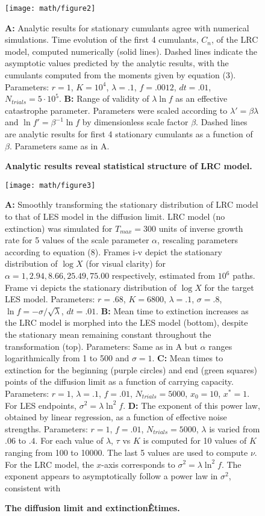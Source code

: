 \newpage
\begin{figure}
\centerline{
	\texttt{[image: math/figure2]}}
	\caption{\textbf{Analytic results reveal statistical structure of LRC model.}}  {\textbf{A:  }Analytic results for stationary cumulants agree with numerical simulations.  Time evolution of the first 4 cumulants, $C_n$, of the LRC model, computed numerically (solid lines).  Dashed lines indicate the asymptotic values predicted by the analytic results, with the cumulants computed from the moments given by equation (3).  Parameters:  $r = 1$, $K = 10^4$, $\lambda = .1$, $f = .0012$, $dt = .01$, $N_{trials} = 5\cdot 10^5$.  \textbf{B:  }Range of validity of $\lambda\ln f$ as an effective catastrophe parameter.  Parameters were scaled according to $\lambda' = \beta\lambda$ and $\ln f' = \beta^{-1}\ln f$ by dimensionless scale factor $\beta$.  Dashed lines are analytic results for first 4 stationary cumulants as a function of $\beta$.  Parameters same as in A.}
\end{figure}

\newpage
 \begin{figure}
\centerline{
	\texttt{[image: math/figure3]}}
		\caption{\textbf{The diffusion limit and extinctionÊtimes.}} {\textbf{A:  }Smoothly transforming the stationary distribution of LRC model to that of LES model in the diffusion limit.  LRC model (no extinction) was simulated for $T_{max} = 300$ units of inverse growth rate for 5 values of the scale parameter $\alpha$, rescaling parameters according to equation (8).  Frames i-v depict the stationary distribution of $\log X$ (for visual clarity) for $\alpha = 1, 2.94, 8.66, 25.49, 75.00$ respectively, estimated from $10^6$ paths.  Frame vi depicts the stationary distribution of $\log X$ for the target LES model.  Parameters:  $r = .68$, $K = 6800$, $\lambda = .1$, $\sigma = .8$, $\ln f = -\sigma/\sqrt{\lambda}$, $dt = .01$.  \textbf{B: }  Mean time to extinction increases as the LRC model is morphed into the LES model (bottom), despite the stationary mean remaining constant throughout the transformation (top).  Parameters:  Same as in A but $\alpha$ ranges logarithmically from 1 to 500 and $\sigma = 1$.  \textbf{C:  } Mean times to extinction for the beginning (purple circles) and end (green squares) points of the diffusion limit as a function of carrying capacity.  Parameters:  $r = 1$, $\lambda = .1$, $f = .01$, $N_{trials} = 5000$, $x_0 = 10$, $x^* = 1$.  For LES endpoints, $\sigma^2 = \lambda \ln^2f$.  \textbf{D:  } The exponent of this power law, obtained by linear regression, as a function of effective noise strengths.  Parameters:  $r = 1$, $f = .01$, $N_{trials} = 5000$, $\lambda$ is varied from $.06$ to $.4$.  For each value of $\lambda$, $\tau$ vs $K$ is computed for 10 values of $K$ ranging from 100 to 10000.  The last 5 values are used to compute $\nu$.  For the LRC model, the $x$-axis corresponds to $\sigma^2 = \lambda\ln^2f$.  The exponent appears to asymptotically follow a power law in $\sigma^2$, consistent with \cite{lande1993risks}}
\end{figure}

